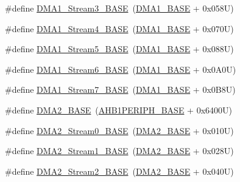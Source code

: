 \begin{DoxyCompactItemize}
\item 
\#define \hyperlink{group___peripheral__memory__map_gac51deb54ff7cfe1290dfcf517ae67127}{D\+M\+A1\+\_\+\+Stream3\+\_\+\+B\+A\+SE}~(\hyperlink{group___peripheral__memory__map_gab2d8a917a0e4ea99a22ac6ebf279bc72}{D\+M\+A1\+\_\+\+B\+A\+SE} + 0x058\+U)
\item 
\#define \hyperlink{group___peripheral__memory__map_ga757a3c0d866c0fe68c6176156065a26b}{D\+M\+A1\+\_\+\+Stream4\+\_\+\+B\+A\+SE}~(\hyperlink{group___peripheral__memory__map_gab2d8a917a0e4ea99a22ac6ebf279bc72}{D\+M\+A1\+\_\+\+B\+A\+SE} + 0x070\+U)
\item 
\#define \hyperlink{group___peripheral__memory__map_ga0ded7bed8969fe2e2d616e7f90eb7654}{D\+M\+A1\+\_\+\+Stream5\+\_\+\+B\+A\+SE}~(\hyperlink{group___peripheral__memory__map_gab2d8a917a0e4ea99a22ac6ebf279bc72}{D\+M\+A1\+\_\+\+B\+A\+SE} + 0x088\+U)
\item 
\#define \hyperlink{group___peripheral__memory__map_ga58998ddc40adb6361704d6c9dad08125}{D\+M\+A1\+\_\+\+Stream6\+\_\+\+B\+A\+SE}~(\hyperlink{group___peripheral__memory__map_gab2d8a917a0e4ea99a22ac6ebf279bc72}{D\+M\+A1\+\_\+\+B\+A\+SE} + 0x0\+A0\+U)
\item 
\#define \hyperlink{group___peripheral__memory__map_ga82186dd6d3f60995d428b34c041919d7}{D\+M\+A1\+\_\+\+Stream7\+\_\+\+B\+A\+SE}~(\hyperlink{group___peripheral__memory__map_gab2d8a917a0e4ea99a22ac6ebf279bc72}{D\+M\+A1\+\_\+\+B\+A\+SE} + 0x0\+B8\+U)
\item 
\#define \hyperlink{group___peripheral__memory__map_gab72a9ae145053ee13d1d491fb5c1df64}{D\+M\+A2\+\_\+\+B\+A\+SE}~(\hyperlink{group___peripheral__memory__map_ga811a9a4ca17f0a50354a9169541d56c4}{A\+H\+B1\+P\+E\+R\+I\+P\+H\+\_\+\+B\+A\+SE} + 0x6400\+U)
\item 
\#define \hyperlink{group___peripheral__memory__map_gac4c67b24726ba6b94d03adb351bcec4d}{D\+M\+A2\+\_\+\+Stream0\+\_\+\+B\+A\+SE}~(\hyperlink{group___peripheral__memory__map_gab72a9ae145053ee13d1d491fb5c1df64}{D\+M\+A2\+\_\+\+B\+A\+SE} + 0x010\+U)
\item 
\#define \hyperlink{group___peripheral__memory__map_ga35512bdc3f5e9df4557c2fbe7935d0b1}{D\+M\+A2\+\_\+\+Stream1\+\_\+\+B\+A\+SE}~(\hyperlink{group___peripheral__memory__map_gab72a9ae145053ee13d1d491fb5c1df64}{D\+M\+A2\+\_\+\+B\+A\+SE} + 0x028\+U)
\item 
\#define \hyperlink{group___peripheral__memory__map_gaed33a06f08188466f2ede06160984e9a}{D\+M\+A2\+\_\+\+Stream2\+\_\+\+B\+A\+SE}~(\hyperlink{group___peripheral__memory__map_gab72a9ae145053ee13d1d491fb5c1df64}{D\+M\+A2\+\_\+\+B\+A\+SE} + 0x040\+U)

\end{DoxyCompactItemize}
